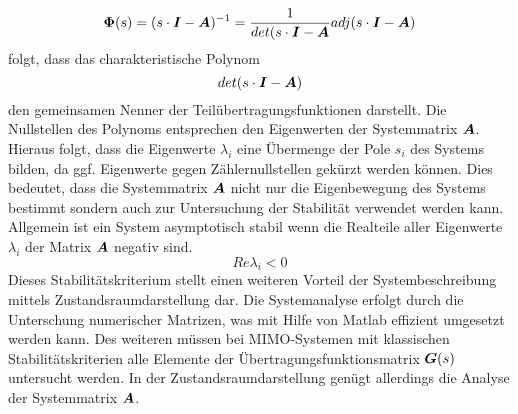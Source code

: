 \begin{equation}
\boldsymbol{\Phi}(s) = (s\cdot \boldsymbol{I}-\boldsymbol{A})^{-1} = \frac{1}{det(s\cdot \boldsymbol{I}  - \boldsymbol{A}}adj(s\cdot \boldsymbol{I} - \boldsymbol{A})
\end{equation}
folgt, dass das charakteristische Polynom
\begin{equation}
det(s\cdot \boldsymbol{I}-\boldsymbol{A})
\end{equation}
den gemeinsamen Nenner der Teilübertragungsfunktionen darstellt. Die Nullstellen des Polynoms entsprechen den Eigenwerten der Systemmatrix $\boldsymbol{A}$. Hieraus folgt, dass die Eigenwerte $\lambda_i$ eine Übermenge der Pole $s_i$ des Systems bilden, da ggf. Eigenwerte gegen  Zählernullstellen gekürzt werden können.
Dies bedeutet, dass die Systemmatrix $\boldsymbol{A}$ nicht nur die Eigenbewegung des Systems bestimmt sondern auch zur Untersuchung der Stabilität verwendet werden kann. Allgemein ist ein System asymptotisch stabil wenn die Realteile aller Eigenwerte $\lambda_i$ der Matrix $\boldsymbol{A}$ negativ sind.
\begin{equation}
Re{\lambda_i} < 0
\end{equation}
Dieses Stabilitätskriterium stellt einen weiteren Vorteil der Systembeschreibung mittels Zustandsraumdarstellung dar. Die Systemanalyse erfolgt durch die Unterschung numerischer Matrizen, was mit Hilfe von Matlab effizient umgesetzt werden kann. Des weiteren müssen bei MIMO-Systemen mit klassischen Stabilitätskriterien alle Elemente der Übertragungsfunktionsmatrix $\boldsymbol{G}(s)$ untersucht werden. In der Zustandsraumdarstellung genügt allerdings die Analyse der Systemmatrix $\boldsymbol{A}$.
